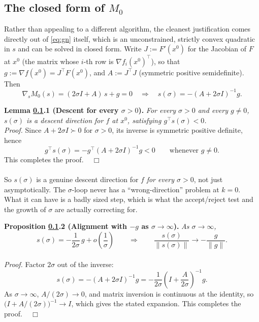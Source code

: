 \documentclass{article}
\newcommand{\halmos}    {\hfill $\;\;\;\Box$\\}
\newcommand{\norm}[1]{\|#1\|}
\begin{document}
\subsection{The closed form of $M_0$}
\label{sec:closedform}

Rather than appealing to a different algorithm, the cleanest justification
comes directly out of \eqref{eq:gn} itself, which is an unconstrained,
strictly convex quadratic in $s$ and can be solved in closed form. Write
$J:=F'(x^0)$ for the Jacobian of $F$ at $x^0$ (the matrix whose $i$-th row
is $\nabla f_i(x^0)^\top$), so that $g:=\nabla f(x^0)=J^\top F(x^0)$, and
$A:=J^\top J$ (symmetric positive semidefinite). Then
\[
\nabla_s M_0(s) = (2\sigma I + A)\,s + g = 0
\quad\Longrightarrow\quad
s(\sigma) = -(A+2\sigma I)^{-1} g.
\]

\noindent
{\bf Lemma \ref{sec:closedform}.1 (Descent for every $\sigma>0$).} {\it For every $\sigma>0$ and every $g\ne0$, $s(\sigma)$ is a descent direction
	for $f$ at $x^0$, satisfying $g^\top s(\sigma) < 0$.
}\\

\noindent
{\it Proof.} Since $A+2\sigma I \succ 0$ for $\sigma>0$, its inverse is symmetric
positive definite, hence
\[
g^\top s(\sigma) = -g^\top (A+2\sigma I)^{-1} g < 0 \qquad \text{whenever } g\ne0.
\]
This completes the proof. \halmos\\
So $s(\sigma)$ is a genuine descent direction for $f$ \emph{for every
	$\sigma>0$}, not just asymptotically. The $\sigma$-loop never has a
``wrong-direction'' problem at $k=0$. What it can have is a
badly sized step, which is what the accept/reject test and the
growth of $\sigma$ are actually correcting for.

\noindent
{\bf Proposition \ref{sec:closedform}.2 (Alignment with $-g$ as $\sigma\to\infty$).} {\it As $\sigma\to\infty$,
	\begin{equation}
		s(\sigma) = -\frac{1}{2\sigma}\,g + o\!\left(\frac1\sigma\right)
		\qquad\Longrightarrow\qquad
		\frac{s(\sigma)}{\norm{s(\sigma)}} \longrightarrow -\frac{g}{\norm{g}}.
		\label{eq:asymptotic}
	\end{equation}
}\\

\noindent
{\it Proof.} Factor $2\sigma$ out of the inverse:
\[
s(\sigma) = -(A+2\sigma I)^{-1}g
= -\frac{1}{2\sigma}\left(I + \frac{A}{2\sigma}\right)^{-1}g.
\]
As $\sigma\to\infty$, $A/(2\sigma)\to0$, and matrix inversion is
continuous at the identity, so $\bigl(I+A/(2\sigma)\bigr)^{-1}\to I$,
which gives the stated expansion. This completes the proof. \halmos\\
\end{document}
